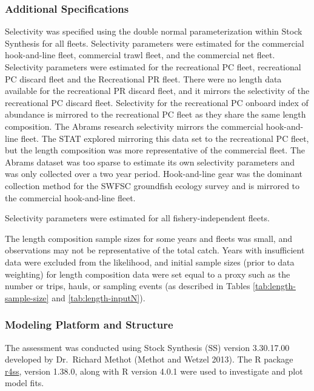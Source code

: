\documentclass[
  english,
  a4paper,
]{article}
\begin{document}
\hypertarget{additional-specifications}{%
\subsubsection{Additional Specifications}\label{additional-specifications}}

Selectivity was specified using the double normal parameterization within Stock Synthesis for all fleets. Selectivity parameters were estimated for the commercial hook-and-line fleet, commercial trawl fleet, and the commercial net fleet. Selectivity parameters were estimated for the recreational PC fleet, recreational PC discard fleet and the Recreational PR fleet. There were no length data available for the recreational PR discard fleet, and it mirrors the selectivity of the recreational PC discard fleet.
Selectivity for the recreational PC onboard index of abundance is mirrored to the recreational
PC fleet as they share the same length composition. The Abrams research selectivity mirrors the
commercial hook-and-line fleet. The STAT explored mirroring this data set to the recreational PC fleet, but the length composition was more representative of the commercial fleet. The Abrams dataset was too sparse to estimate its own selectivity parameters and was only collected over a two year period. Hook-and-line gear was the
dominant collection method for the SWFSC groundfish ecology survey and is mirrored to the commercial hook-and-line fleet.

Selectivity parameters were estimated for all fishery-independent fleets.

The length composition sample sizes for some years and fleets was small, and observations may not be
representative of the total catch. Years with insufficient data were excluded from the likelihood, and initial sample sizes (prior to data weighting) for length composition data were set equal to a proxy such as the number or trips, hauls, or sampling events (as described in Tables \ref{tab:length-sample-size} and \ref{tab:length-inputN}).

\hypertarget{modeling-platform-and-structure}{%
\subsubsection{Modeling Platform and Structure}\label{modeling-platform-and-structure}}

The assessment was conducted using Stock Synthesis (SS) version 3.30.17.00 developed by
Dr.~Richard Methot (Methot and Wetzel 2013). The R package \href{https://github.com/r4ss/r4ss}{r4ss}, version
1.38.0, along with R version 4.0.1 were used to investigate and plot model fits.
\end{document}
